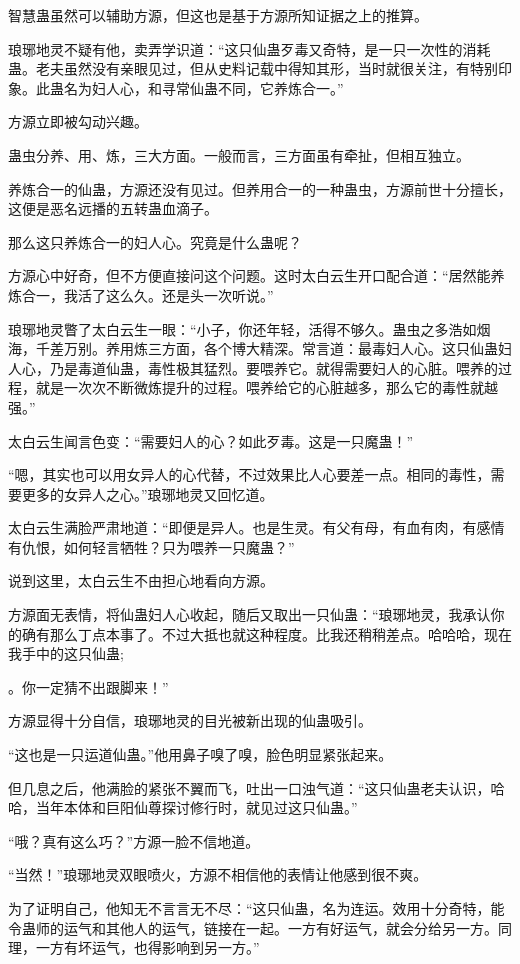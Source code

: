 \begin{this_body}
智慧蛊虽然可以辅助方源，但这也是基于方源所知证据之上的推算。

琅琊地灵不疑有他，卖弄学识道：“这只仙蛊歹毒又奇特，是一只一次性的消耗蛊。老夫虽然没有亲眼见过，但从史料记载中得知其形，当时就很关注，有特别印象。此蛊名为妇人心，和寻常仙蛊不同，它养炼合一。”

方源立即被勾动兴趣。

蛊虫分养、用、炼，三大方面。一般而言，三方面虽有牵扯，但相互独立。

养炼合一的仙蛊，方源还没有见过。但养用合一的一种蛊虫，方源前世十分擅长，这便是恶名远播的五转蛊血滴子。

那么这只养炼合一的妇人心。究竟是什么蛊呢？

方源心中好奇，但不方便直接问这个问题。这时太白云生开口配合道：“居然能养炼合一，我活了这么久。还是头一次听说。”

琅琊地灵瞥了太白云生一眼：“小子，你还年轻，活得不够久。蛊虫之多浩如烟海，千差万别。养用炼三方面，各个博大精深。常言道：最毒妇人心。这只仙蛊妇人心，乃是毒道仙蛊，毒性极其猛烈。要喂养它。就得需要妇人的心脏。喂养的过程，就是一次次不断微炼提升的过程。喂养给它的心脏越多，那么它的毒性就越强。”

太白云生闻言色变：“需要妇人的心？如此歹毒。这是一只魔蛊！”

“嗯，其实也可以用女异人的心代替，不过效果比人心要差一点。相同的毒性，需要更多的女异人之心。”琅琊地灵又回忆道。

太白云生满脸严肃地道：“即便是异人。也是生灵。有父有母，有血有肉，有感情有仇恨，如何轻言牺牲？只为喂养一只魔蛊？”

说到这里，太白云生不由担心地看向方源。

方源面无表情，将仙蛊妇人心收起，随后又取出一只仙蛊：“琅琊地灵，我承认你的确有那么丁点本事了。不过大抵也就这种程度。比我还稍稍差点。哈哈哈，现在我手中的这只仙蛊;

。你一定猜不出跟脚来！”

方源显得十分自信，琅琊地灵的目光被新出现的仙蛊吸引。

“这也是一只运道仙蛊。”他用鼻子嗅了嗅，脸色明显紧张起来。

但几息之后，他满脸的紧张不翼而飞，吐出一口浊气道：“这只仙蛊老夫认识，哈哈，当年本体和巨阳仙尊探讨修行时，就见过这只仙蛊。”

“哦？真有这么巧？”方源一脸不信地道。

“当然！”琅琊地灵双眼喷火，方源不相信他的表情让他感到很不爽。

为了证明自己，他知无不言言无不尽：“这只仙蛊，名为连运。效用十分奇特，能令蛊师的运气和其他人的运气，链接在一起。一方有好运气，就会分给另一方。同理，一方有坏运气，也得影响到另一方。”


\end{this_body}
